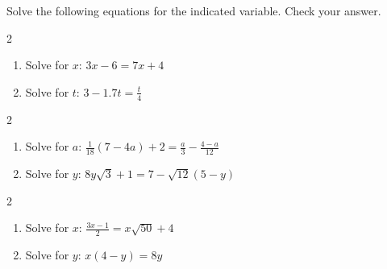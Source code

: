 \documentclass{ximera}
\begin{document}
\begin{example}\label{lineareqnreview}  Solve the following equations for the indicated variable.  Check your answer.

\begin{multicols}{2}

\begin{enumerate}

\item  Solve for $x$: $3x - 6 = 7x + 4$

\item  Solve for $t$: $3 - 1.7t =  \frac{t}{4}$

\setcounter{HW}{\value{enumi}}

\end{enumerate}

\end{multicols}

\begin{multicols}{2}

\begin{enumerate}

\setcounter{enumi}{\value{HW}}

\item  Solve for $a$: $ \frac{1}{18}(7 - 4a) + 2 =  \frac{a}{3} -  \frac{4-a}{12}$

\item  Solve for $y$:  $8 y \sqrt{3} + 1 = 7 - \sqrt{12}(5 - y)$

\setcounter{HW}{\value{enumi}}

\end{enumerate}

\end{multicols}

\begin{multicols}{2}

\begin{enumerate}

\setcounter{enumi}{\value{HW}}

\item  Solve for $x$: $ \frac{3x-1}{2} = x\sqrt{50} + 4$

\item  Solve for $y$:  $x(4-y) = 8y$

\setcounter{HW}{\value{enumi}}

\end{enumerate}


\end{multicols}
\end{example}
\end{document}
